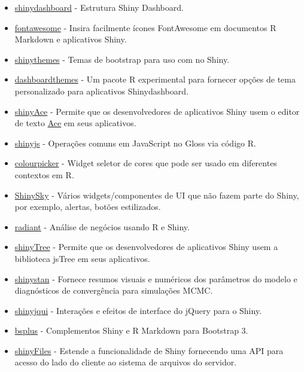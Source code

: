 \documentclass[
]{book}
\begin{document}
\begin{itemize}
\item
  \href{http://rstudio.github.io/shinydashboard/}{shinydashboard} - Estrutura Shiny Dashboard.
\item
  \href{https://rstudio.github.io/fontawesome/}{fontawesome} - Insira facilmente ícones FontAwesome em documentos R Markdown e aplicativos Shiny.
\item
  \href{http://rstudio.github.io/shinythemes/}{shinythemes} - Temas de bootstrap para uso com no Shiny.
\item
  \href{https://nik01010.wordpress.com/}{dashboardthemes} - Um pacote R experimental para fornecer opções de tema personalizado para aplicativos Shinydashboard.
\item
  \href{http://trestletech.github.io/shinyAce/}{shinyAce} - Permite que os desenvolvedores de aplicativos Shiny usem o editor de texto \href{https://ace.c9.io/\#nav=about}{Ace} em seus aplicativos.
\item
  \href{https://deanattali.com/shinyjs/}{shinyjs} - Operações comuns em JavaScript no Gloss via código R.
\item
  \href{https://daattali.com/shiny/colourInput/}{colourpicker} - Widget seletor de cores que pode ser usado em diferentes contextos em R.
\item
  \href{https://github.com/AnalytixWare/ShinySky}{ShinySky} - Vários widgets/componentes de UI que não fazem parte do Shiny, por exemplo, alertas, botões estilizados.
\item
  \href{https://radiant-rstats.github.io/docs/}{radiant} - Análise de negócios usando R e Shiny.
\item
  \href{https://github.com/shinyTree/shinyTree}{shinyTree} - Permite que os desenvolvedores de aplicativos Shiny usem a biblioteca jsTree em seus aplicativos.
\item
  \href{https://mc-stan.org/users/interfaces/shinystan.html}{shinystan} - Fornece resumos visuais e numéricos dos parâmetros do modelo e diagnósticos de convergência para simulações MCMC.
\item
  \href{https://yang-tang.github.io/shinyjqui/}{shinyjqui} - Interações e efeitos de interface do jQuery para o Shiny.
\item
  \href{http://ijlyttle.github.io/bsplus/}{bsplus} - Complementos Shiny e R Markdown para Bootstrap 3.
\item
  \href{https://github.com/thomasp85/shinyFiles}{shinyFiles} - Estende a funcionalidade de Shiny fornecendo uma API para acesso do lado do cliente ao sistema de arquivos do servidor.

\end{itemize}
\end{document}
